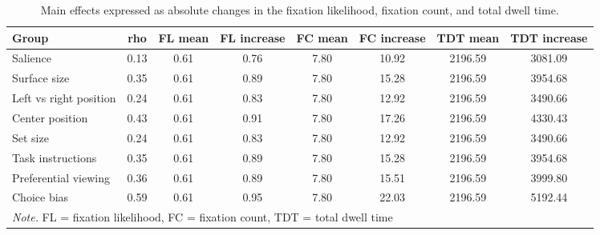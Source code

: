 \begin{table}[ht]
\centering
\caption{Main effects expressed as absolute changes in the fixation likelihood, fixation count, and total dwell time.} 
\label{tab:em_results}
\begingroup\small
\begin{tabular}{p{2cm}ccccccc}
  \hline
Group & rho & FL mean & FL increase & FC mean & FC increase & TDT mean & TDT increase \\ 
  \hline
Salience & 0.13 & 0.61 & 0.76 & 7.80 & 10.92 & 2196.59 & 3081.09 \\ 
  Surface size & 0.35 & 0.61 & 0.89 & 7.80 & 15.28 & 2196.59 & 3954.68 \\ 
  Left vs right position & 0.24 & 0.61 & 0.83 & 7.80 & 12.92 & 2196.59 & 3490.66 \\ 
  Center position & 0.43 & 0.61 & 0.91 & 7.80 & 17.26 & 2196.59 & 4330.43 \\ 
  Set size & 0.24 & 0.61 & 0.83 & 7.80 & 12.92 & 2196.59 & 3490.66 \\ 
  Task instructions & 0.35 & 0.61 & 0.89 & 7.80 & 15.28 & 2196.59 & 3954.68 \\ 
  Preferential viewing & 0.36 & 0.61 & 0.89 & 7.80 & 15.51 & 2196.59 & 3999.80 \\ 
  Choice bias & 0.59 & 0.61 & 0.95 & 7.80 & 22.03 & 2196.59 & 5192.44 \\ 
   \hline 
 \multicolumn{10}{p{0.95\textwidth}}{\scriptsize{\textit{Note.} FL = fixation likelihood, FC = fixation count, TDT = total dwell time}} 
\end{tabular}
\endgroup
\end{table}
